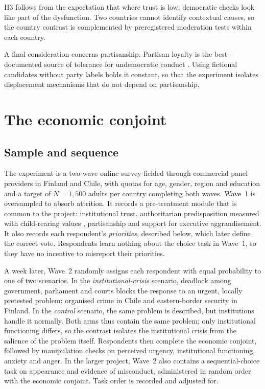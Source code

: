 \documentclass[11pt]{article}
\begin{document}
H3 follows from the expectation that where trust is low, democratic checks look like part of the dysfunction. Two countries cannot identify contextual causes, so the country contrast is complemented by preregistered moderation tests within each country.

A final consideration concerns partisanship. Partisan loyalty is the best-documented source of tolerance for undemocratic conduct \parencite{GrahamSvolik2020}. Using fictional candidates without party labels holds it constant, so that the experiment isolates displacement mechanisms that do not depend on partisanship.

\section{The economic conjoint}

\subsection{Sample and sequence}

The experiment is a two-wave online survey fielded through commercial panel providers in Finland and Chile, with quotas for age, gender, region and education and a target of $N=1{,}500$ adults per country completing both waves. Wave~1 is oversampled to absorb attrition. It records a pre-treatment module that is common to the project: institutional trust, authoritarian predisposition measured with child-rearing values \parencite{Helminen2023}, partisanship and support for executive aggrandisement. It also records each respondent's \emph{priorities}, described below, which later define the correct vote. Respondents learn nothing about the choice task in Wave~1, so they have no incentive to misreport their priorities.

A week later, Wave~2 randomly assigns each respondent with equal probability to one of two scenarios. In the \emph{institutional-crisis} scenario, deadlock among government, parliament and courts blocks the response to an urgent, locally pretested problem: organised crime in Chile and eastern-border security in Finland. In the \emph{control} scenario, the same problem is described, but institutions handle it normally. Both arms thus contain the same problem; only institutional functioning differs, so the contrast isolates the institutional crisis from the salience of the problem itself. Respondents then complete the economic conjoint, followed by manipulation checks on perceived urgency, institutional functioning, anxiety and anger. In the larger project, Wave~2 also contains a sequential-choice task on appearance and evidence of misconduct, administered in random order with the economic conjoint. Task order is recorded and adjusted for.
\end{document}
